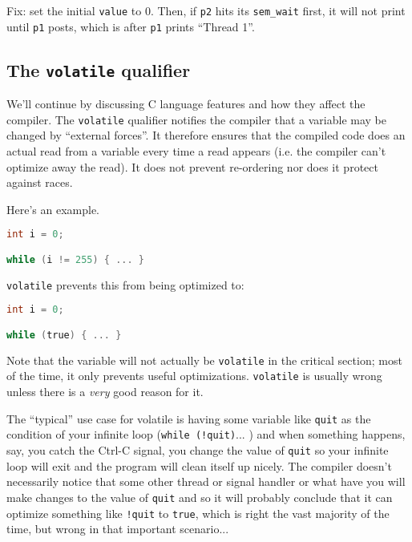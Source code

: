 Fix: set the initial {\tt value} to 0. Then, if {\tt p2} hits
its {\tt sem\_wait} first, it will not print until {\tt p1} posts, which is after 
{\tt p1} prints ``Thread 1''.


\subsection*{The {\tt volatile} qualifier}
We'll continue by discussing C language features and how they affect
the compiler. The {\tt volatile} qualifier notifies the compiler that
a variable may be changed by ``external forces''. It therefore ensures
that the compiled code does an actual read from a variable every time
a read appears (i.e. the compiler can't optimize away the read). It
does not prevent re-ordering nor does it protect against races.

Here's an example.
  \begin{lstlisting}[language=C]
int i = 0;

while (i != 255) { ... }
  \end{lstlisting}

{\tt volatile} prevents this from being optimized to:

  \begin{lstlisting}[language=C]
int i = 0;

while (true) { ... }
  \end{lstlisting}

Note that the variable will not actually be {\tt volatile} in the
critical section; most of the time, it only prevents useful
optimizations. {\tt volatile} is usually wrong unless there is a
\emph{very} good reason for it.

The ``typical'' use case for volatile is having some variable like \texttt{quit} as the condition of your infinite loop (\texttt{while (!quit)}... ) and when something happens, say, you catch the Ctrl-C signal, you change the value of \texttt{quit} so your infinite loop will exit and the program will clean itself up nicely. The compiler doesn't necessarily notice that some other thread or signal handler or what have you will make changes to the value of \texttt{quit} and so it will probably conclude that it can optimize something like \texttt{!quit} to \texttt{true}, which is right the vast majority of the time, but wrong in that important scenario...

  



